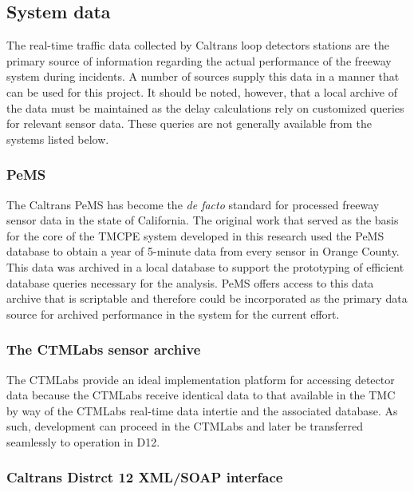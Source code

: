 \documentclass[12pt]{report}
\newcounter{time}
\begin{document}
\subsection{System data}
\label{sec:system-data}

The real-time traffic data collected by Caltrans loop detectors
stations are the primary source of information regarding the actual
performance of the freeway system during incidents. A number of
sources supply this data in a manner that can be used for this
project.  It should be noted, however, that a local archive of the
data must be maintained as the delay calculations rely on customized
queries for relevant sensor data.  These queries are not generally
available from the systems listed below.

\subsubsection{PeMS}
\label{sec:pems}

The Caltrans \acl{PeMS} has become the \emph{de facto} standard for
processed freeway sensor data in the state of California.  The
original work that served as the basis for the core of the \ac{TMCPE}
system developed in this research
\citep{recker05:_tool_for_incor_of_non} used the \ac{PeMS} database to
obtain a year of 5-minute data from every sensor in Orange County.
This data was archived in a local database to support the prototyping
of efficient database queries necessary for the analysis.  \ac{PeMS}
offers access to this data archive that is scriptable and therefore
could be incorporated as the primary data source for archived
performance in the system for the current effort.

\subsubsection{The CTMLabs sensor archive}
\label{sec:uci-data}


The \ac{CTMLabs} provide an ideal implementation platform for
accessing detector data because the \ac{CTMLabs} receive identical
data to that available in the \ac{TMC} by way of the \ac{CTMLabs}
real-time data intertie and the associated database.  As such,
development can proceed in the \ac{CTMLabs} and later be transferred
seamlessly to operation in \ac{D12}.

\subsubsection{Caltrans Distrct 12 XML/SOAP interface}
\label{sec:d12-soap}
\end{document}
